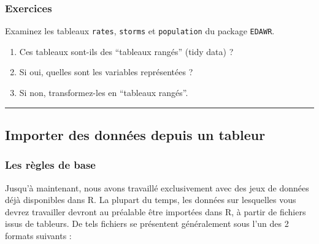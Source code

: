 \documentclass[a4paperpaper,]{article}
\providecommand{\tightlist}{%
  \setlength{\itemsep}{0pt}\setlength{\parskip}{0pt}}
\theoremstyle{definition}
\theoremstyle{definition}
\theoremstyle{definition}
\theoremstyle{remark}
\begin{document}
\subsubsection{Exercices}\label{exercices-7}

Examinez les tableaux \texttt{rates}, \texttt{storms} et
\texttt{population} du package \texttt{EDAWR}.

\begin{enumerate}
\def\labelenumi{\arabic{enumi}.}
\tightlist
\item
  Ces tableaux sont-ils des ``tableaux rangés'' (tidy data) ?
\item
  Si oui, quelles sont les variables représentées ?
\item
  Si non, transformez-les en ``tableaux rangés''.
\end{enumerate}

\begin{center}\rule{0.5\linewidth}{\linethickness}\end{center}

\subsection{Importer des données depuis un
tableur}\label{importer-des-donnees-depuis-un-tableur}

\subsubsection{Les règles de base}\label{les-regles-de-base}

Jusqu'à maintenant, nous avons travaillé exclusivement avec des jeux de
données déjà disponibles dans R. La plupart du temps, les données sur
lesquelles vous devrez travailler devront au préalable être importées
dans R, à partir de fichiers issus de tableurs. De tels fichiers se
présentent généralement sous l'un des 2 formats suivants :
\end{document}
